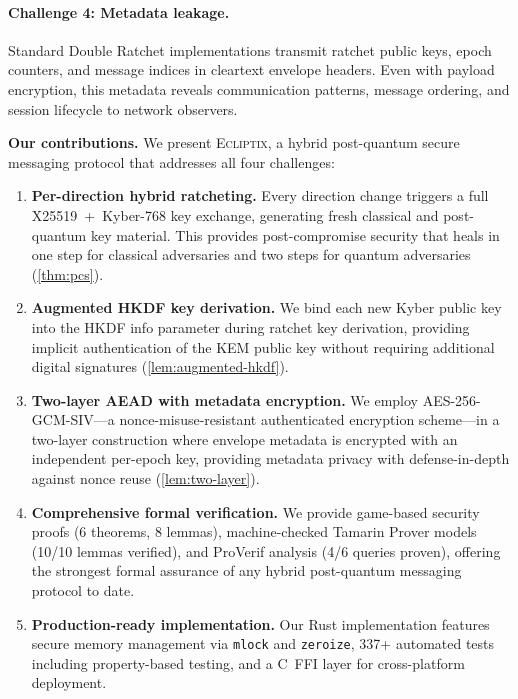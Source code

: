 \documentclass[11pt,a4paper]{article}
\theoremstyle{definition}
\begin{document}
\paragraph{Challenge 4: Metadata leakage.}
Standard Double Ratchet implementations transmit ratchet public keys, epoch counters, and message indices in cleartext envelope headers. Even with payload encryption, this metadata reveals communication patterns, message ordering, and session lifecycle to network observers.

\medskip
\noindent\textbf{Our contributions.} We present \textsc{Ecliptix}, a hybrid post-quantum secure messaging protocol that addresses all four challenges:

\begin{enumerate}
  \item \textbf{Per-direction hybrid ratcheting.} Every direction change triggers a full X25519~+~Kyber-768 key exchange, generating fresh classical and post-quantum key material. This provides post-compromise security that heals in one step for classical adversaries and two steps for quantum adversaries (\cref{thm:pcs}).

  \item \textbf{Augmented HKDF key derivation.} We bind each new Kyber public key into the HKDF info parameter during ratchet key derivation, providing implicit authentication of the KEM public key without requiring additional digital signatures (\cref{lem:augmented-hkdf}).

  \item \textbf{Two-layer AEAD with metadata encryption.} We employ AES-256-GCM-SIV---a nonce-misuse-resistant authenticated encryption scheme---in a two-layer construction where envelope metadata is encrypted with an independent per-epoch key, providing metadata privacy with defense-in-depth against nonce reuse (\cref{lem:two-layer}).

  \item \textbf{Comprehensive formal verification.} We provide game-based security proofs (6 theorems, 8 lemmas), machine-checked Tamarin Prover models (10/10 lemmas verified), and ProVerif analysis (4/6 queries proven), offering the strongest formal assurance of any hybrid post-quantum messaging protocol to date.

  \item \textbf{Production-ready implementation.} Our Rust implementation features secure memory management via \texttt{mlock} and \texttt{zeroize}, 337+ automated tests including property-based testing, and a C~FFI layer for cross-platform deployment.
\end{enumerate}
\end{document}
